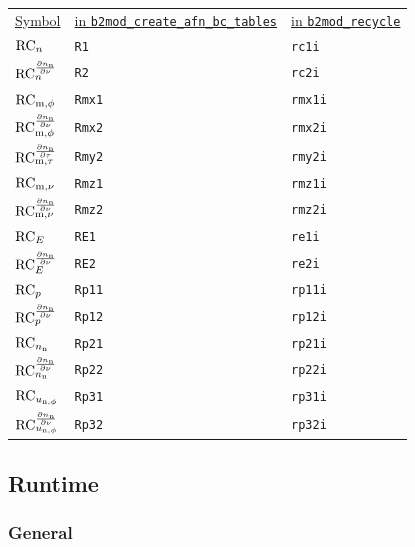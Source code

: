\begin{tabular}{L{2cm} L{6cm} L{4cm}}
\underline{Symbol} & \underline{in \texttt{b2mod\_create\_afn\_bc\_tables}} & \underline{in \texttt{b2mod\_recycle}} \\
$\rconei$ & \texttt{R1} & \texttt{rc1i} \\
$\rctwoi$ & \texttt{R2} & \texttt{rc2i} \\
$\rmxonei$ & \texttt{Rmx1} &  \texttt{rmx1i} \\
$\rmxtwoi$ & \texttt{Rmx2} & \texttt{rmx2i} \\
$\rmytwoi$ & \texttt{Rmy2} & \texttt{rmy2i} \\
$\rmzonei$ & \texttt{Rmz1} &  \texttt{rmz1i} \\
$\rmztwoi$ & \texttt{Rmz2} &  \texttt{rmz2i} \\
$\reonei$ & \texttt{RE1} & \texttt{re1i} \\
$\retwoi$ & \texttt{RE2} & \texttt{re2i} \\
$\rponeonei$ & \texttt{Rp11} & \texttt{rp11i} \\
$\rponetwoi$ & \texttt{Rp12} &  \texttt{rp12i} \\
$\rptwoonei$ & \texttt{Rp21} &  \texttt{rp21i} \\
$\rptwotwoi$ & \texttt{Rp22} & \texttt{rp22i} \\
$\rpthreeonei$ & \texttt{Rp31} & \texttt{rp31i} \\
$\rpthreetwoi$ & \texttt{Rp32} & \texttt{rp32i} \\
\end{tabular}


\subsection{Runtime}

\subsubsection{General}

